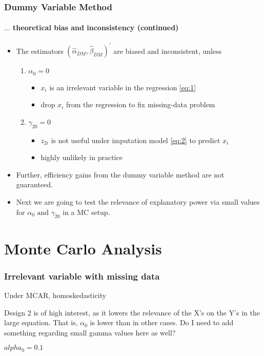 \documentclass[aspectratio=1610]{beamer}
\begin{document}
\begin{frame}
	\frametitle{Dummy Variable Method}
	\framesubtitle{$\ldots$ theoretical bias and inconsistency (continued)}
	\begin{itemize}
		\item<1-> The estimators $(\hat{\alpha}_{DM}, \hat{\beta}_{DM})^{\prime}$ are biased and inconsistent, unless
		\begin{enumerate}
			\item<2-> $\alpha_0 = 0$
			\begin{itemize}
				\item<2-> $x_i$ is an irrelevant variable in the regression \eqref{eq:1}
				\item<2-> drop $x_i$ from the regression to fix missing-data problem
			\end{itemize}
			\item<3-> $\gamma_{20} = 0$
			\begin{itemize}
				\item<3-> $z_{2i}$ is not useful under imputation model \eqref{eq:2} to predict $x_i$
				\item<3-> highly unlikely in practice
			\end{itemize}
		\end{enumerate}
		\item<4-> Further, efficiency gains from the dummy variable method are not guaranteed.
		\item<4-> Next we are going to test the relevance of explanatory power via small values for $\alpha_0 \text{ and } \gamma_{20}$ in a MC setup.
	\end{itemize}
\end{frame}

\section{Monte Carlo Analysis}

\begin{frame}
	\frametitle{Irrelevant variable with missing data}
	Under MCAR, homoskedasticity

	Design 2 is of high interest, as it lowers the relevance of the X's on the Y's in the large equation. That is, $\alpha_0$ is lower than in other cases. Do I need to add something regarding small gamma values here as well?

	$alpha_0 = 0.1$
\end{frame}
\begin{frame}
    
\end{frame}
\end{document}
